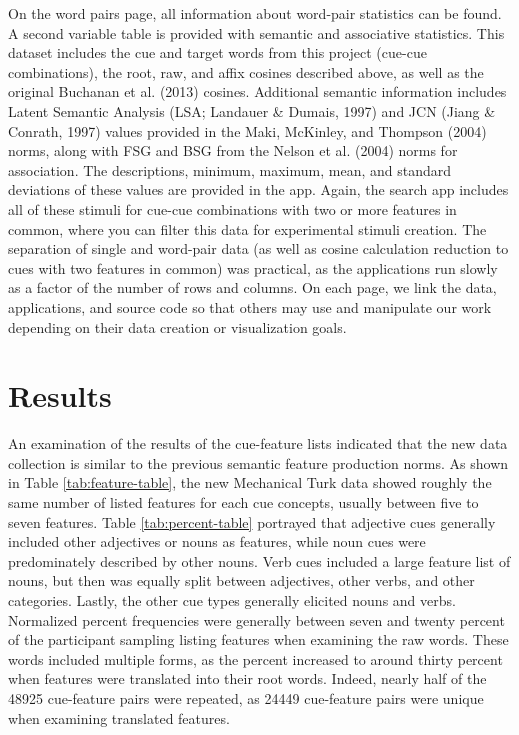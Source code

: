 \documentclass[english,man]{apa6}
\theoremstyle{definition}
\theoremstyle{definition}
\theoremstyle{definition}
\theoremstyle{remark}
\begin{document}
On the word pairs page, all information about word-pair statistics can
be found. A second variable table is provided with semantic and
associative statistics. This dataset includes the cue and target words
from this project (cue-cue combinations), the root, raw, and affix
cosines described above, as well as the original Buchanan et al. (2013)
cosines. Additional semantic information includes Latent Semantic
Analysis (LSA; Landauer \& Dumais, 1997) and JCN (Jiang \& Conrath,
1997) values provided in the Maki, McKinley, and Thompson (2004) norms,
along with FSG and BSG from the Nelson et al. (2004) norms for
association. The descriptions, minimum, maximum, mean, and standard
deviations of these values are provided in the app. Again, the search
app includes all of these stimuli for cue-cue combinations with two or
more features in common, where you can filter this data for experimental
stimuli creation. The separation of single and word-pair data (as well
as cosine calculation reduction to cues with two features in common) was
practical, as the applications run slowly as a factor of the number of
rows and columns. On each page, we link the data, applications, and
source code so that others may use and manipulate our work depending on
their data creation or visualization goals.

\section{Results}\label{results}

An examination of the results of the cue-feature lists indicated that
the new data collection is similar to the previous semantic feature
production norms. As shown in Table \ref{tab:feature-table}, the new
Mechanical Turk data showed roughly the same number of listed features
for each cue concepts, usually between five to seven features. Table
\ref{tab:percent-table} portrayed that adjective cues generally included
other adjectives or nouns as features, while noun cues were
predominately described by other nouns. Verb cues included a large
feature list of nouns, but then was equally split between adjectives,
other verbs, and other categories. Lastly, the other cue types generally
elicited nouns and verbs. Normalized percent frequencies were generally
between seven and twenty percent of the participant sampling listing
features when examining the raw words. These words included multiple
forms, as the percent increased to around thirty percent when features
were translated into their root words. Indeed, nearly half of the 48925
cue-feature pairs were repeated, as 24449 cue-feature pairs were unique
when examining translated features.
\end{document}
